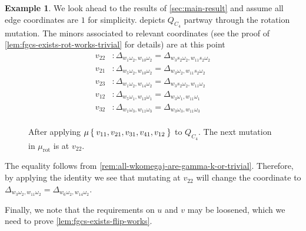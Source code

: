 \documentclass{amsart}
\theoremstyle{plain}
\theoremstyle{definition}
\newtheorem{example}[theorem]{Example}
\theoremstyle{remark}
\newcommand{\fundamentalweight}{\omega}
\newcommand{\genminoryz}[3]{\Delta_{{#1} \fundamentalweight_{#3}, {#2}%
    \fundamentalweight_{#3}}}
\newcommand{\murot}{{\mu_{\text{rot}}}}
\begin{document}
  \begin{example}
    We look ahead to the results of \cref{sec:main-result} and assume
    all edge coordinates are $1$ for simplicity.
     depicts $Q_{C_4}$ partway through the
    rotation mutation. The minors associated to relevant coordinates
    (see the proof of \cref{lem:fgcs-exists-rot-works-trivial} for
    details) are at this point
    \begin{align*}
      v_{22} &: \genminoryz{w_1}{w_{10}}{2} = \genminoryz{w_{3} s_2}{w_{11} s_2}{2}\\
      v_{21} &: \genminoryz{w_5}{w_{10}}{2} = \genminoryz{w_{3} }{w_{11} s_2}{2}\\
      v_{23} &: \genminoryz{w_1}{w_{14}}{2} = \genminoryz{w_{3} s_2}{w_{11} }{2}\\
      v_{12} &: \genminoryz{w_5}{w_{13}}{1} = \genminoryz{w_{3} }{w_{11} }{1}\\
      v_{32} &: \genminoryz{w_1}{w_{11}}{3} = \genminoryz{w_{3} }{w_{11} }{3}\\
    \end{align*}

    \begin{figure}[h]
      \centering
      

      \caption{After applying $\mu\Set{v_{11}, v_{21}, v_{31}, v_{41},
          v_{12}}$ to $Q_{C_4}$. The next mutation in $\murot$ is at
        $v_{22}$.
        \label{fig:QC4-middle-murot}
      }
    \end{figure}

    The equality follows from
    \cref{rem:all-wkomegaj-are-gamma-k-or-trivial}. Therefore, by
    applying the identity we see that mutating at $v_{22}$ will change
    the coordinate to $\genminoryz{w_{3}}{w_{11}}{2} =
    \genminoryz{w_{6}}{w_{14}}{2}$.
  \end{example}

  Finally, we note that the requirements on $u$ and $v$ may be loosened,
  which we need to prove \cref{lem:fgcs-exists-flip-works}.
\end{document}
